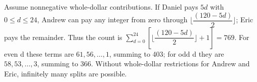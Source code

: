 Assume nonnegative whole-dollar contributions. If Daniel pays $5d$ with $0\le d\le24$, Andrew can pay any integer from zero through $\lfloor\dfrac{(120-5d)}{2}\rfloor$; Eric pays the remainder. Thus the count is $\sum_{d=0}^{24}[\lfloor\dfrac{(120-5d)}{2}\rfloor+1]=\boxed{769}$. For even d these terms are $61,56,\ldots,1$, summing to 403; for odd d they are $58,53,\ldots,3$, summing to 366. Without whole-dollar restrictions for Andrew and Eric, infinitely many splits are possible.
